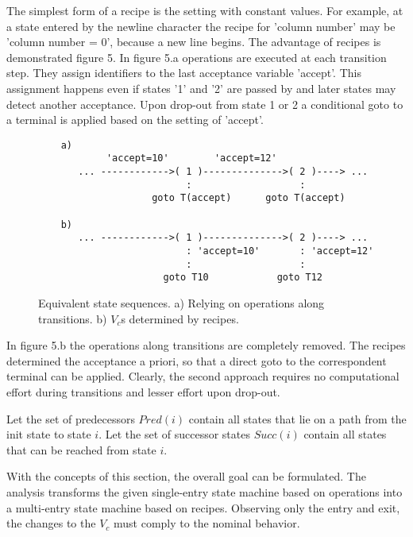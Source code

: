 \documentclass[12pt,a4paper]{scrartcl}
\begin{document}
The simplest form of a recipe is the setting with constant values.  For
example, at a state entered by the newline character the recipe for 'column
number' may be 'column number = 0', because a new line begins. The advantage of
recipes is demonstrated figure 5.  In figure 5.a operations are executed at
each transition step. They assign identifiers to the last acceptance variable
'accept'. This assignment happens even if states '1' and '2' are passed by and
later states may detect another acceptance. Upon drop-out from state 1 or 2 a
conditional goto to a terminal is applied based on the setting of 'accept'. 

\begin{figure}[htbp] \leavevmode
\begin{verbatim}
    a)        
            'accept=10'        'accept=12'        
       ... ------------>( 1 )-------------->( 2 )----> ...
                          :                   :
                    goto T(accept)      goto T(accept)

    b) 
       ... ------------>( 1 )-------------->( 2 )----> ...
                          : 'accept=10'       : 'accept=12'              
                          :                   :
                      goto T10            goto T12

\end{verbatim}
\caption{Equivalent state sequences. a) Relying on operations along
transitions. b) $V_c$s determined by recipes.}
\end{figure}


In figure 5.b the operations along transitions are completely removed. The
recipes determined the acceptance a priori, so that a direct goto to the
correspondent terminal can be applied.  Clearly, the second approach requires
no computational effort during transitions and lesser effort upon drop-out.

Let the set of predecessors $Pred(i)$ contain all states that lie on a path
from the init state to state $i$. Let the set of successor states $Succ(i)$
contain all states that can be reached from state $i$.

With the concepts of this section, the overall goal can be formulated. The
analysis transforms the given single-entry state machine based on operations
into a multi-entry state machine based on recipes. Observing only the entry and
exit, the changes to the $V_c$ must comply to the nominal behavior. 

%
\end{document}
